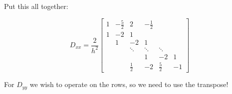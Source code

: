 Put this all together:

$$D_{xx} = \frac{2}{h^2}\begin{bmatrix}
1 & -\frac{5}{2} & 2 & -\frac{1}{2} \\
1 & -2 & 1 \\
& 1 & -2 & 1 \\
& & \ddots & \ddots & \ddots \\
& & & 1 & -2 & 1 \\
& & \frac{1}{2} & -2 & \frac{5}{2} & -1
\end{bmatrix}$$

For $D_{yy}$ we wish to operate on the rows, so we need to use the transpose!
